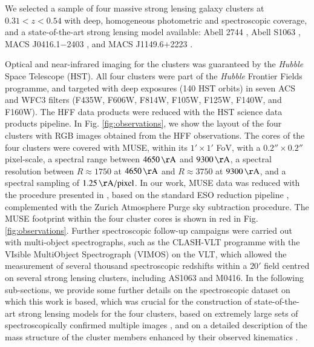 \documentclass{aa}
\begin{document}
We selected a sample of four massive strong lensing galaxy clusters at $0.31<z<0.54$ with deep, homogeneous photometric and spectroscopic coverage, and a state-of-the-art strong lensing model available: Abell 2744 \citep[$z=0.307$, hereafter A2744,][]{allen98,ebeling10}, Abell S1063 \citep[$z=0.346$, hereafter AS1063,][]{abell89,karman15,mercurio21}, MACS J0416.1$-$2403 \citep[$z=0.397$, hereafter M0416,][]{ebeling01,balestra16}, and MACS J1149.6$+$2223 \citep[$z=0.542$, hereafter M1149,][]{smith09,grillo16}.

Optical and near-infrared imaging for the clusters was guaranteed by the \textit{Hubble} Space Telescope (HST). All four clusters were part of the \textit{Hubble} Frontier Fields \citep[HFF,][]{lotz17} programme, and targeted with deep exposures (140 HST orbits) in seven ACS and WFC3 filters (F435W, F606W, F814W, F105W, F125W, F140W, and F160W). The HFF data products were reduced with the HST science data products pipeline. In Fig. \ref{fig:observations}, we show the layout of the four clusters with RGB images obtained from the HFF observations.
The cores of the four clusters were covered with MUSE, within its $1'\times1'$ FoV, with a $0.2''\times0.2''$ pixel-scale, a spectral range between $4650 \, \rm \AA$ and $9300 \, \rm \AA$, a spectral resolution between $R \approx 1750$ at $4650 \, \rm \AA$ and $R \approx 3750$ at $9300 \, \rm \AA$, and a spectral sampling of $1.25 \, \mathrm{\AA/pixel}$. In our work, MUSE data was reduced with the procedure presented in \cite{caminha17a,caminha17b,caminha19}, based on the standard ESO reduction pipeline \citep{weilbacher20}, complemented with the Zurich Atmosphere Purge \citep[ZAP,][]{soto16} sky subtraction procedure. The MUSE footprint within the four cluster cores is shown in red in Fig. \ref{fig:observations}. Further spectroscopic follow-up campaigns were carried out with multi-object spectrographs, such as the CLASH-VLT programme \citep[][]{rosati14} with the VIsible MultiObject Spectrograph (VIMOS) on the VLT, which allowed the measurement of several thousand spectroscopic redshifts within a $20'$ field centred on several strong lensing clusters, including AS1063 and M0416. In the following sub-sections, we provide some further details on the spectroscopic dataset on which this work is based, which was crucial for the construction of state-of-the-art strong lensing models for the four clusters, based on extremely large sets of spectroscopically confirmed multiple images \citep[see e.g.][]{richard21,caminha16,caminha17a,grillo16,schuldt24}, and on a detailed description of the mass structure of the cluster members enhanced by their observed kinematics \citep[see][]{bergamini19,bergamini22,bergamini23,granata22}.
\end{document}
